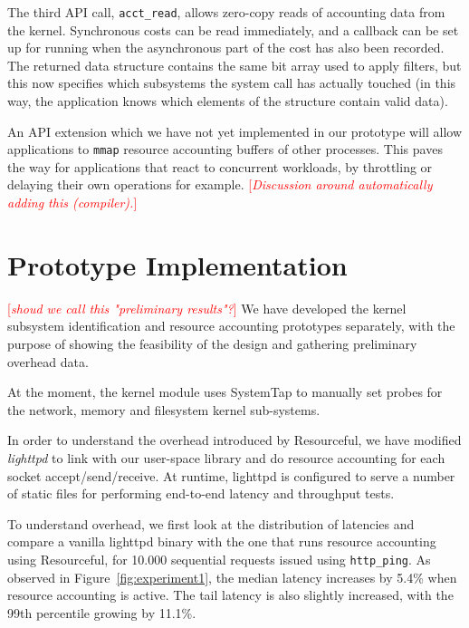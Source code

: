 \documentclass[letterpaper,twocolumn,10pt]{article}
\newcommand{\pname}{Resourceful}
\newcommand{\lnote}[1]{\textcolor{red}{[\textit{#1}]}} %
\begin{document}
The third API call, \texttt{acct\_read}, allows zero-copy reads of accounting
data from the kernel. Synchronous costs can be read immediately, and a callback
can be set up for running when the asynchronous part of the cost has also been
recorded. The returned data structure contains the same bit array used to apply
filters, but this now specifies which subsystems the system call has actually touched
(in this way, the application knows which elements of the structure contain valid data).

An API extension which we have not yet implemented in our prototype will allow applications
to \texttt{mmap} resource accounting buffers of other processes. This paves the way for applications that
react to concurrent workloads, by throttling or delaying their own
operations for example.
\lnote{Discussion around automatically adding this (compiler).}

\section{Prototype Implementation}
\lnote{shoud we call this "preliminary results"?} 
We have developed the kernel subsystem identification and resource accounting
prototypes separately, with the purpose of showing the feasibility of the design
and gathering preliminary overhead data.

At the moment, the kernel module uses SystemTap to manually set probes for the
network, memory and filesystem kernel sub-systems.

In order to understand the overhead introduced by \pname, we have modified
\textit{lighttpd} to link with our user-space library and do resource accounting
for each socket accept/send/receive. At runtime, lighttpd is configured to serve
a number of static files for performing end-to-end latency and throughput tests.

To understand overhead, we first look at the distribution of latencies and
compare a vanilla lighttpd binary with the one that runs resource accounting
using \pname, for 10.000 sequential requests issued using \texttt{http\_ping}. As
observed in Figure~\ref{fig:experiment1}, the median latency increases by 5.4\%
when resource accounting is active. The tail latency is also slightly increased,
with the 99th percentile growing by 11.1\%.
\end{document}
